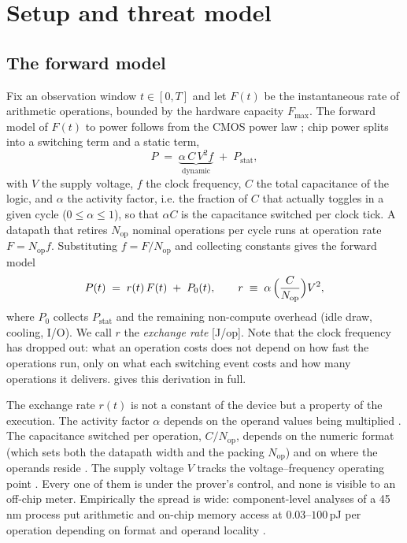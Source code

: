 \documentclass{article}
\theoremstyle{plain}
\theoremstyle{definition}
\theoremstyle{remark}
\begin{document}
\section{Setup and threat model}
\label{sec:setup}

\subsection{The forward model}
\label{subsec:forward}

Fix an observation window $t \in [0,T]$ and let $F(t)$ be the instantaneous
rate of arithmetic operations, bounded by the hardware capacity
$F_{\max}$. The forward model of $F(t)$ to power follows from the CMOS power law
\citep{chandrakasan1992lowpower}; chip power splits into a switching term and
a static term,
\begin{equation}
	P \;=\; \underbrace{\alpha\,C\,V^2 f}_{\text{dynamic}} \;+\; P_{\mathrm{stat}},
	\label{eq:cmoslaw}
\end{equation}
with $V$ the supply voltage, $f$ the clock frequency, $C$ the total capacitance of
the logic, and $\alpha$ the activity factor, i.e. the fraction of $C$ that
actually toggles in a given cycle ($0 \le \alpha \le 1$), so that
$\alpha C$ is the capacitance switched per clock tick. A datapath that retires $N_{\mathrm{op}}$
nominal operations per cycle runs at operation rate $F = N_{\mathrm{op}}f$.
Substituting $f = F/N_{\mathrm{op}}$ and collecting constants gives the
forward model
\begin{equation}
	P(t) \;=\; r(t)\,F(t) \;+\; P_0(t), \qquad
	r \;\equiv\; \alpha\,\Bigl(\frac{C}{N_{\mathrm{op}}}\Bigr) V^2 ,
	\label{eq:forward}
\end{equation}
where $P_0$ collects $P_{\mathrm{stat}}$ and the remaining non-compute
overhead (idle draw, cooling, I/O). We call $r$ the \emph{exchange rate}
[J/op]. Note that the clock frequency
has dropped out: what an operation costs does not depend on
how fast the operations run, only on what each switching event costs and how
many operations it delivers.  gives this derivation in full.

The exchange rate $r(t)$ is not a constant of the device but a property of the
execution. The activity factor $\alpha$ depends on the operand values being
multiplied \citep{chandrakasan1992lowpower}. The capacitance switched per operation,
$C/N_{\mathrm{op}}$, depends on the numeric format (which sets both the
datapath width and the packing $N_{\mathrm{op}}$) and on where the operands
reside \citep{horowitz2014computing}. The supply voltage $V$ tracks the
voltage--frequency operating point \citep{pallipadi2006ondemand}. Every one
of them is under the prover's control, and none is visible to an off-chip
meter. Empirically the spread is wide: component-level analyses of a 45\,nm
process put arithmetic and on-chip memory access at $0.03$--$100$\,pJ per
operation depending on format and operand locality
\citep{horowitz2014computing}. 
\end{document}
